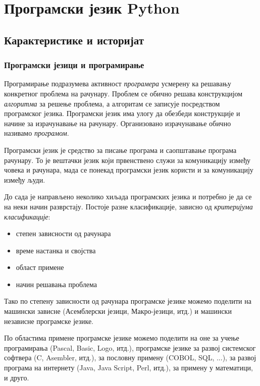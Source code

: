 \section{Програмски језик Python}

\subsection{Карактеристике и историјат}

\subsubsection{Програмски језици и програмирање}

Програмирање подразумева активност \emph{програмера} усмерену ка решавању конкретног проблема на рачунару. Проблем се обично решава конструкцијом \emph{алгоритма} за решење проблема, а алгоритам се записује посредством програмског језика. Програмски језик има улогу да обезбеди конструкције и начине за израчунавање на рачунару. Организовано израчунавање обично називамо \emph{програмом}.

Програмски језик је средство за писање програма и саопштавање програма рачунару. То је вештачки језик који првенствено служи за комуникацију између човека и рачунара, мада се понекад програмски језик користи и за комуникацију између људи.

До сада је направљено неколико хиљада програмских језика и потребно је да се на неки начин разврстају. Постоје разне класификације, зависно од \emph{критеријума класификације}:

\begin{itemize}
\item степен зависности од рачунара
\item време настанка и својства
\item област примене
\item начин решавања проблема
\end{itemize}

Тако по степену зависности од рачунара програмске језике можемо поделити на машински зависне (Асемблерски језици, Макро-језици, итд.) и машински независне програмске језике.

По областима примене програмске језике можемо поделити на оне за учење програмирања (Pascal, Basic, Logo, итд.), програмске језике за развој системског софтвера (C, Asembler, итд.), за пословну примену (COBOL, SQL, ...), за развој програма на интернету (Java, Java Script, Perl, итд.), за примену у математици, и друго.

